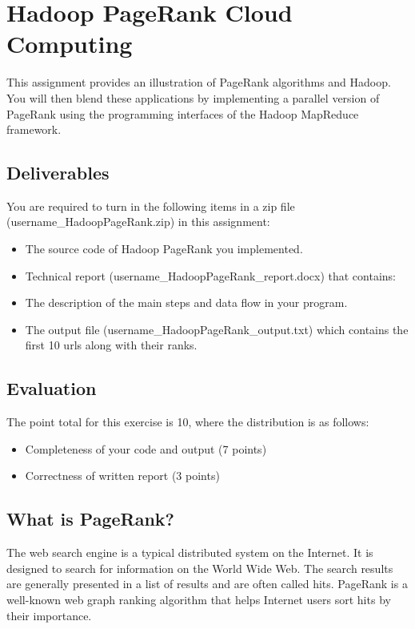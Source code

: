 
\section{Hadoop PageRank Cloud Computing}
 
This assignment provides an illustration of PageRank algorithms and Hadoop. You
will then blend these applications by implementing a parallel version of
PageRank using the programming interfaces of the Hadoop MapReduce framework. 


\subsection{Deliverables}
You are required to turn in the following items in a zip file
(username\_HadoopPageRank.zip) in this assignment: 

\begin{itemize}
\item The source code of Hadoop PageRank you implemented.
\item Technical report (username\_HadoopPageRank\_report.docx) that contains: 
\item The description of the main steps and data flow in your program. 
\item The output file (username\_HadoopPageRank\_output.txt) which contains the
  first 10 urls along with their ranks. 

\end{itemize}

\subsection{Evaluation}
The point total for this exercise is 10, where the distribution is as follows:
\begin{itemize}
\item Completeness of your code and output (7 points)
\item Correctness of written report (3 points)
\end{itemize}

\subsection{What is PageRank?}
The web search engine is a typical distributed system on the Internet. It is
designed to search for information on the World Wide Web. The search results
are generally presented in a list of results and are often called hits.
PageRank is a well-known web graph ranking algorithm that helps Internet users
sort hits by their importance. 

